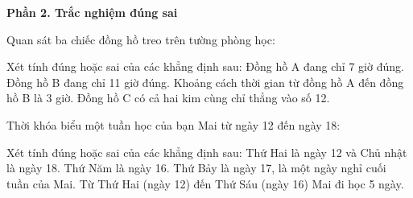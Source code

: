 \newpage

\textbf{Phần 2. Trắc nghiệm đúng sai}

\begin{ex} %
Quan sát ba chiếc đồng hồ treo trên tường phòng học:
\begin{center}\vspace{-3mm}
\vspace{-3mm}\end{center}
Xét tính đúng hoặc sai của các khẳng định sau:
\choiceTF
{\True Đồng hồ A đang chỉ 7 giờ đúng.}
{Đồng hồ B đang chỉ 11 giờ đúng.}
{\True Khoảng cách thời gian từ đồng hồ A đến đồng hồ B là 3 giờ.}
{\True Đồng hồ C có cả hai kim cùng chỉ thẳng vào số 12.}
\end{ex}

\begin{ex} %
Thời khóa biểu một tuần học của bạn Mai từ ngày 12 đến ngày 18:
\begin{center}\vspace{-3mm}
\vspace{-3mm}\end{center}
Xét tính đúng hoặc sai của các khẳng định sau:
\choiceTF
{\True Thứ Hai là ngày 12 và Chủ nhật là ngày 18.}
{Thứ Năm là ngày 16.}
{\True Thứ Bảy là ngày 17, là một ngày nghỉ cuối tuần của Mai.}
{\True Từ Thứ Hai (ngày 12) đến Thứ Sáu (ngày 16) Mai đi học 5 ngày.}
\end{ex}

